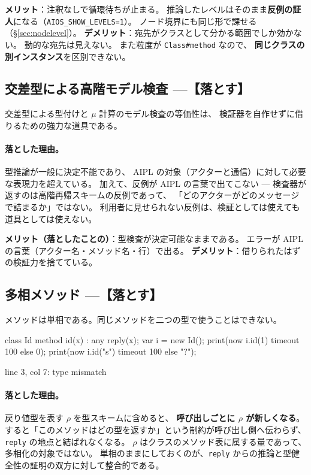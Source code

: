 \documentclass[11pt,a4paper]{ltjsarticle}
\theoremstyle{definition}
\theoremstyle{remark}
\begin{document}
\textbf{メリット}：注釈なしで循環待ちが止まる。
推論したレベルはそのまま\textbf{反例の証人}になる（\texttt{AIOS\_SHOW\_LEVELS=1}）。
ノード境界にも同じ形で課せる（\S\ref{sec:nodelevel}）。
\textbf{デメリット}：宛先がクラスとして分かる範囲でしか効かない。
動的な宛先は見えない。
また粒度が \texttt{Class\#method} なので、
\textbf{同じクラスの別インスタンス}を区別できない。

\subsection{交差型による高階モデル検査 ---【落とす】}


交差型による型付けと $\mu$ 計算のモデル検査の等価性は、
検証器を自作せずに借りるための強力な道具である。

\paragraph{落とした理由。}
型推論が一般に決定不能であり、
AIPL の対象（アクターと通信）に対して必要な表現力を超えている。
加えて、反例が AIPL の言葉で出てこない ---
検査器が返すのは高階再帰スキームの反例であって、
「どのアクターがどのメッセージで詰まるか」ではない。
利用者に見せられない反例は、検証としては使えても道具としては使えない。

\textbf{メリット（落としたことの）}：型検査が決定可能なままである。
エラーが AIPL の言葉（アクター名・メソッド名・行）で出る。
\textbf{デメリット}：借りられたはずの検証力を捨てている。

\subsection{多相メソッド ---【落とす】}


メソッドは単相である。同じメソッドを二つの型で使うことはできない。

\begin{aipl}
class Id { method id(x) : any { reply(x); } }
var i = new Id();
print(now i.id(1) timeout 100 else 0);
print(now i.id("s") timeout 100 else "?");
\end{aipl}
\begin{term}
 line 3, col 7: type mismatch
\end{term}

\paragraph{落とした理由。}
戻り値型を表す $\rho$ を型スキームに含めると、
\textbf{呼び出しごとに $\rho$ が新しくなる}。
すると「このメソッドはどの型を返すか」という制約が呼び出し側へ伝わらず、
\texttt{reply} の地点と結ばれなくなる。
$\rho$ はクラスのメソッド表に属する量であって、多相化の対象ではない。
単相のままにしておくのが、\texttt{reply} からの推論と型健全性の証明の双方に対して整合的である。
\end{document}
